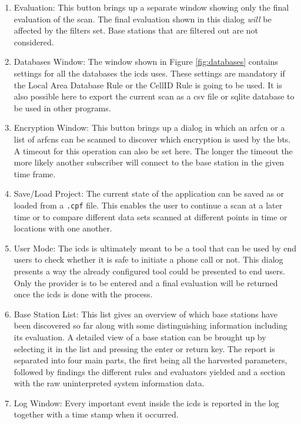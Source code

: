 \begin{enumerate}
\item Evaluation: This button brings up a separate window showing only the final evaluation of the scan.
The final evaluation shown in this dialog \emph{will} be affected by the filters set.
Base stations that are filtered out are not considered.

\item Databases Window: The window shown in Figure \ref{fig:databases} contains settings for all the databases the \gls{icds} uses.
These settings are mandatory if the Local Area Database Rule or the CellID Rule is going to be used.
It is also possible here to export the current scan as a \gls{csv} file or sqlite database to be used in other programs.

\item Encryption Window: This button brings up a dialog in which an \gls{arfcn} or a list of \glspl{arfcn} can be scanned to discover which encryption is used by the \gls{bts}.
A timeout for this operation can also be set here.
The longer the timeout the more likely another subscriber will connect to the base station in the given time frame.

\item Save/Load Project: The current state of the application can be saved as or loaded from a \texttt{.cpf} file.
This enables the user to continue a scan at a later time or to compare different data sets scanned at different points in time or locations with one another.

\item User Mode: The \gls{icds} is ultimately meant to be a tool that can be used by end users to check whether it is safe to initiate a phone call or not.
This dialog presents a way the already configured tool could be presented to end users.
Only the provider is to be entered and a final evaluation will be returned once the \gls{icds} is done with the process.

\item Base Station List: This list gives an overview of which base stations have been discovered so far along with some distinguishing information including its evaluation.
A detailed view of a base station can be brought up by selecting it in the list and pressing the enter or return key.
The report is separated into four main parts, the first being all the harvested parameters, followed by findings the different rules and evaluators yielded and a section with the raw uninterpreted system information data.
 
\item Log Window: Every important event inside the \gls{icds} is reported in the log together with a time stamp when it occurred.


\end{enumerate}

